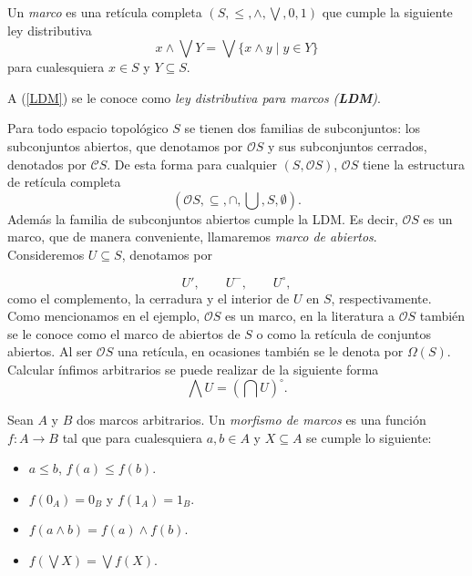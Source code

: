 \documentclass{comunicaciones}
\begin{document}
    \begin{dfn}\label{frm}
    Un \emph{marco} es una retícula completa $(S, \leq, \wedge, \bigvee, 0, 1)$ que cumple la siguiente ley distributiva 
    \begin{equation}\label{LDM}
    x\wedge\bigvee Y=\bigvee\{x\wedge y\mid y\in Y\}
    \end{equation}
    para cualesquiera $x\in S$ y $Y\subseteq S$.
    \end{dfn}
    
    A (\ref{LDM}) se le conoce como \emph{ley distributiva para marcos} \emph{(\textbf{LDM})}.

    \begin{ej}\label{ejem1}
    Para todo espacio topológico $S$ se tienen dos familias de subconjuntos: los subconjuntos abiertos, que denotamos por $\mathcal{O}S$ y sus subconjuntos cerrados, denotados por $\mathcal{C}S$. De esta forma para cualquier $(S,\mathcal{O}S)$, $\mathcal{O}S$ tiene la estructura  de retícula completa $$(\mathcal{O}S, \subseteq, \cap,\bigcup, S,\emptyset).$$
    Además la familia de subconjuntos abiertos cumple la LDM. Es decir, $\mathcal{O}S$ es un marco, que de manera conveniente, llamaremos \emph{marco de abiertos}.\\
    
    Consideremos $U\subseteq S$, denotamos por
    
    \[
    U',\qquad U^-,\qquad U^\circ,
    \]
    como el complemento, la cerradura y el interior de $U$ en $S$, respectivamente.\\ 
    
    Como mencionamos en el ejemplo, $\mathcal{O}S$ es un marco, en la literatura a $\mathcal{O}S$ también se le conoce como el marco de abiertos de $S$ o como la retícula de conjuntos abiertos. Al ser $\mathcal{O}S$ una retícula, en ocasiones también se le denota por $\Omega(S)$.\\
    
    Calcular ínfimos arbitrarios se puede realizar de la siguiente forma 
    \[
    \bigwedge U=\left(\bigcap U\right)^\circ.
    \]
    \end{ej}

    \begin{dfn}\label{morf}
        Sean $A$ y $B$ dos marcos arbitrarios. Un \emph{morfismo de marcos} es una función $f\colon A\rightarrow B$ tal que para cualesquiera $a,b\in A$ y $X\subseteq A$ se cumple lo siguiente:
        \begin{itemize}
        \item $a\leq b$, $f(a)\leq f(b)$.
        \item $f(0_A)=0_B$ y $f(1_A)=1_B$.
        \item $f(a\wedge b)= f(a)\wedge f(b)$.
        \item $f(\bigvee X)=\bigvee f(X)$.
        \end{itemize}
        \end{dfn}
\end{document}

